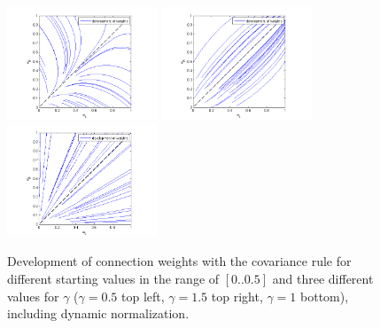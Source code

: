 \documentclass{scrartcl}
\begin{document}
\begin{figure}
\centering
\includegraphics[trim = {1.8cm 0 2.5cm 0.4cm}, width=0.4\textwidth, clip]{../pics/g1t2}
\includegraphics[trim = {1.8cm 0 2.5cm 0.4cm}, width=0.4\textwidth, clip]{../pics/g3t2}
\includegraphics[trim = {1.8cm 0 2.5cm 0.4cm}, width=0.4\textwidth, clip]{../pics/g2t2}
\caption{Development of connection weights with the covariance rule for different starting values in the range of $[0..0.5]$ and three different values for $\gamma$ ($\gamma = 0.5$ top left, $\gamma = 1.5$ top right, $\gamma = 1$ bottom), including dynamic normalization.}
\label{dyn}
\end{figure}
\end{document}
